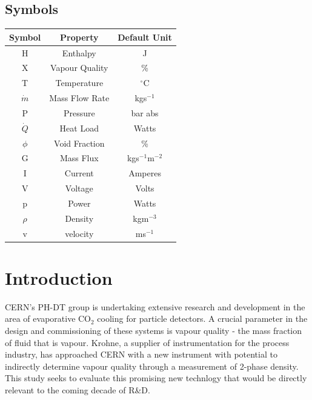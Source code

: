 \documentclass{report}
\begin{document}
\section*{Symbols}
\begin{center}
\begin{tabular}{|c|c|c|}
\hline
\textbf{Symbol} & \textbf{Property} & \textbf{Default Unit} \\\hline
H & Enthalpy & J \\\hline
X & Vapour Quality & \% \\\hline
T & Temperature & $^\circ$C\\\hline
$\dot{m}$ & Mass Flow Rate & kgs$^{-1}$ \\\hline
P & Pressure & bar abs \\\hline
$\dot{Q}$ & Heat Load & Watts \\\hline
$\phi$ & Void Fraction & \% \\\hline
G & Mass Flux & kgs$^{-1}$m$^{-2}$\\\hline
I & Current & Amperes \\\hline
V & Voltage & Volts \\\hline
p & Power & Watts \\\hline
$\rho$ & Density & kgm$^{-3}$\\\hline
v & velocity &  ms$^{-1}$\\\hline
\end{tabular}
\end{center}
\tableofcontents
\chapter{Introduction}
\doublespacing
CERN's PH-DT group is undertaking extensive research and development in the area of evaporative CO$_2$ cooling for particle detectors. A crucial parameter in the design and commissioning of these systems is vapour quality - the mass fraction of fluid that is vapour. Krohne, a supplier of instrumentation for the process industry, has approached CERN with a new instrument with potential to indirectly determine vapour quality through a measurement of 2-phase density. This study seeks to evaluate this promising new technlogy that would be directly relevant to the coming decade of R\&\ignorespaces D. 
\end{document}
